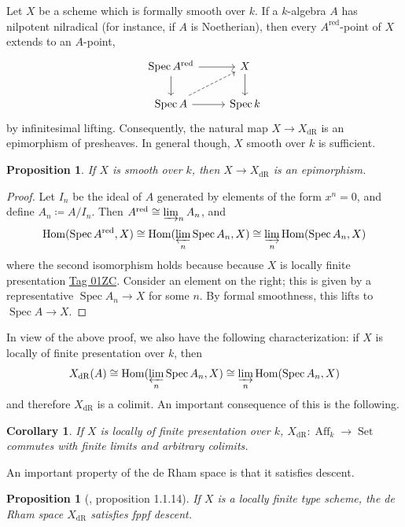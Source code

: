 \documentclass{article}
\newtheorem{proposition}[theorem]{Proposition}
\newtheorem{corollary}[theorem]{Corollary}
\theoremstyle{definition}
\theoremstyle{remark}
\DeclareMathOperator{\spec}{Spec}
\DeclareMathOperator{\homm}{Hom}
\renewcommand{\hom}{\homm}
\DeclareMathOperator{\dr}{dR}
\DeclareMathOperator{\red}{red}
\DeclareMathOperator{\aff}{Aff}
\DeclareMathOperator{\set}{Set}
\begin{document}
Let $X$ be a scheme which is formally smooth over $k$. If a $k$-algebra $A$ has nilpotent nilradical (for instance, if $A$ is Noetherian), then every $A^{\red}$-point of $X$ extends to an $A$-point,
\[\begin{tikzcd}
  {\spec A^{\red}} & X \\
  {\spec A} & {\spec k}
  \arrow[from=1-1, to=1-2]
  \arrow[from=1-1, to=2-1]
  \arrow[from=1-2, to=2-2]
  \arrow[dashed, from=2-1, to=1-2]
  \arrow[from=2-1, to=2-2]
\end{tikzcd}\]
by infinitesimal lifting.
Consequently, the natural map $X \to X_{\dr}$ is an epimorphism of presheaves. In general though, $X$ smooth over $k$ is sufficient. 

\begin{proposition} If $X$ is smooth over $k$, then $X \to X_{\dr}$ is an epimorphism.
\end{proposition} 
\begin{proof}

Let $I_{n}$ be the ideal of $A$ generated by elements of the form $x^n = 0$, and define $A_n \coloneqq A/I_n$. Then $ A^{\red} \cong \varinjlim_n A_n$, and
$$ \hom(\spec A^{\red}, X) \cong \hom(\varprojlim_n \spec A_n, X) \cong \varinjlim_n \hom(\spec A_n,X)$$
where the second isomorphism holds because because $X$ is locally finite presentation \cite{stacks-project} \href{https://stacks.math.columbia.edu/tag/01ZC}{Tag 01ZC}. Consider an element on the right; this is given by a representative $\spec A_n \to X$ for some $n$. By formal smoothness, this lifts to $\spec A \to X$.
\end{proof}

In view of the above proof, we also have the following characterization: if $X$ is locally of finite presentation over $k$, then
$$ X_{\dr}(A) \cong \hom(\varprojlim_n \spec A_n,X) \cong \varinjlim_n \hom(\spec A_n,X)$$
and therefore $X_{\dr}$ is a colimit. An important consequence of this is the following.

\begin{corollary} If $X$ is locally of finite presentation over $k$, $X_{\dr}: \aff_k \to \set$ commutes with finite limits and arbitrary colimits.
\end{corollary}


An important property of the de Rham space is that it satisfies descent.

\begin{proposition}[\cite{Rib24}, proposition 1.1.14] If $X$ is a locally finite type scheme, the de Rham space $X_{\dr}$ satisfies fppf descent.
\end{proposition}
\end{document}
